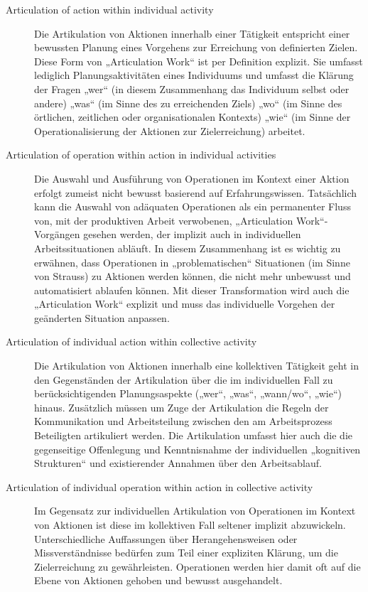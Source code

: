 \begin{description}
	\item[Articulation of action within individual activity] Die Artikulation von Aktionen innerhalb einer Tätigkeit entspricht einer bewussten Planung eines Vorgehens zur Erreichung von definierten Zielen. Diese Form von „Articulation Work“ ist per Definition explizit. Sie umfasst lediglich Planungsaktivitäten eines Individuums und umfasst die Klärung der Fragen „wer“ (in diesem Zusammenhang das Individuum selbst oder andere) „was“ (im Sinne des zu erreichenden Ziels) „wo“ (im Sinne des örtlichen, zeitlichen oder organisationalen Kontexts) „wie“ (im Sinne der Operationalisierung der Aktionen zur Zielerreichung) arbeitet.
	\item[Articulation of operation within action in individual activities] Die Auswahl und Ausführung von Operationen im Kontext einer Aktion erfolgt zumeist nicht bewusst basierend auf Erfahrungswissen. Tatsächlich kann die Auswahl von adäquaten Operationen als ein permanenter Fluss von, mit der produktiven Arbeit verwobenen, „Articulation Work“-Vorgängen gesehen werden, der implizit auch in individuellen Arbeitssituationen abläuft. In diesem Zusammenhang ist es wichtig zu erwähnen, dass Operationen in „problematischen“ Situationen (im Sinne von Strauss) zu Aktionen werden können, die nicht mehr unbewusst und automatisiert ablaufen können. Mit dieser Transformation wird auch die „Articulation Work“ explizit und muss das individuelle Vorgehen der geänderten Situation anpassen. 
	\item[Articulation of individual action within collective activity] Die Artikulation von Aktionen innerhalb eine kollektiven Tätigkeit geht in den Gegenständen der Artikulation über die im individuellen Fall zu berücksichtigenden Planungsaspekte („wer“, „was“, „wann/wo“, „wie“) hinaus. Zusätzlich müssen um Zuge der Artikulation die Regeln der Kommunikation und Arbeitsteilung zwischen den am Arbeitsprozess Beteiligten artikuliert werden. Die Artikulation umfasst hier auch die die gegenseitige Offenlegung und Kenntnisnahme der individuellen „kognitiven Strukturen“ und existierender Annahmen über den Arbeitsablauf.
	\item[Articulation of individual operation within action in collective activity] Im Gegensatz zur individuellen Artikulation von Operationen im Kontext von Aktionen ist diese im kollektiven Fall seltener implizit abzuwickeln. Unterschiedliche Auffassungen über Herangehensweisen oder Missverständnisse bedürfen zum Teil einer expliziten Klärung, um die Zielerreichung zu gewährleisten. Operationen werden hier damit oft auf die Ebene von Aktionen gehoben und bewusst ausgehandelt.

\end{description}
